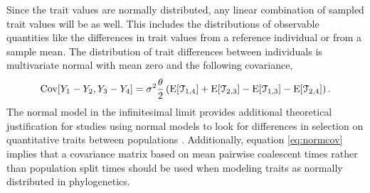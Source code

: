 Since the trait values are normally distributed, any linear combination of
sampled trait values will be as well. This includes the distributions of
observable quantities like the differences in trait values from a reference
individual or from a sample mean. The distribution of trait differences between
individuals is multivariate normal with mean zero and the following covariance,
\begin{equation}
  \label{eq:normcov}
\mathrm{Cov}[Y_1-Y_2,Y_3-Y_4] = \sigma^2\frac{\theta}{2}\left( \mathrm{E}[\mathcal{T}_{1,4}] + \mathrm{E}[\mathcal{T}_{2,3}] -
\mathrm{E}[\mathcal{T}_{1,3}] - \mathrm{E}[\mathcal{T}_{2,4}] \right).
\end{equation}
The normal model in the infinitesimal limit provides additional theoretical
justification for studies using normal models to look for differences in
selection on quantitative traits between populations
\citep{Ovaskainen2011,Praebel2013,Robinson2015}. Additionally, equation
\eqref{eq:normcov} implies that a covariance matrix based on mean pairwise
coalescent times rather than population split times should be used when modeling
traits as normally distributed in phylogenetics.

 
